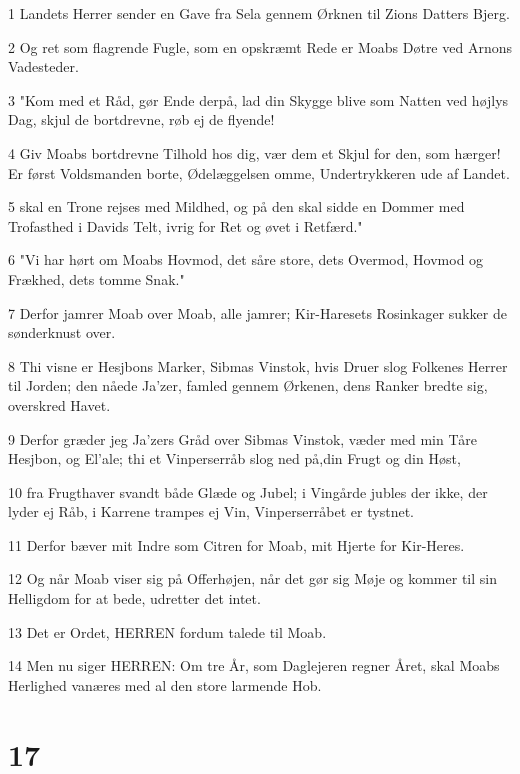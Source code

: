 \par 1 Landets Herrer sender en Gave fra Sela gennem Ørknen til Zions Datters Bjerg.
\par 2 Og ret som flagrende Fugle, som en opskræmt Rede er Moabs Døtre ved Arnons Vadesteder.
\par 3 "Kom med et Råd, gør Ende derpå, lad din Skygge blive som Natten ved højlys Dag, skjul de bortdrevne, røb ej de flyende!
\par 4 Giv Moabs bortdrevne Tilhold hos dig, vær dem et Skjul for den, som hærger! Er først Voldsmanden borte, Ødelæggelsen omme, Undertrykkeren ude af Landet.
\par 5 skal en Trone rejses med Mildhed, og på den skal sidde en Dommer med Trofasthed i Davids Telt, ivrig for Ret og øvet i Retfærd."
\par 6 "Vi har hørt om Moabs Hovmod, det såre store, dets Overmod, Hovmod og Frækhed, dets tomme Snak."
\par 7 Derfor jamrer Moab over Moab, alle jamrer; Kir-Haresets Rosinkager sukker de sønderknust over.
\par 8 Thi visne er Hesjbons Marker, Sibmas Vinstok, hvis Druer slog Folkenes Herrer til Jorden; den nåede Ja'zer, famled gennem Ørkenen, dens Ranker bredte sig, overskred Havet.
\par 9 Derfor græder jeg Ja'zers Gråd over Sibmas Vinstok, væder med min Tåre Hesjbon, og El'ale; thi et Vinperserråb slog ned på,din Frugt og din Høst,
\par 10 fra Frugthaver svandt både Glæde og Jubel; i Vingårde jubles der ikke, der lyder ej Råb, i Karrene trampes ej Vin, Vinperserråbet er tystnet.
\par 11 Derfor bæver mit Indre som Citren for Moab, mit Hjerte for Kir-Heres.
\par 12 Og når Moab viser sig på Offerhøjen, når det gør sig Møje og kommer til sin Helligdom for at bede, udretter det intet.
\par 13 Det er Ordet, HERREN fordum talede til Moab.
\par 14 Men nu siger HERREN: Om tre År, som Daglejeren regner Året, skal Moabs Herlighed vanæres med al den store larmende Hob.

\chapter{17}

